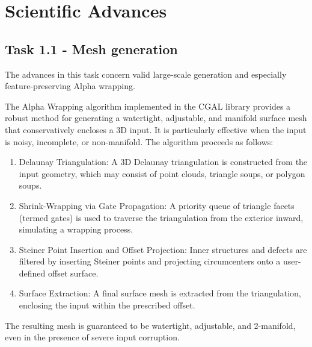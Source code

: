 \begin{itemize}
%
\end{itemize} 

\section{Scientific Advances}

\subsection{Task 1.1 - Mesh generation}
The advances in this task concern valid large-scale generation and especially feature-preserving Alpha wrapping.

The Alpha Wrapping algorithm implemented in the CGAL library provides a robust method for generating a watertight, adjustable, and manifold surface mesh that conservatively encloses a 3D input. It is particularly effective when the input is noisy, incomplete, or non-manifold. The algorithm proceeds as follows:

\begin{enumerate}
\item Delaunay Triangulation: A 3D Delaunay triangulation is constructed from the input geometry, which may consist of point clouds, triangle soups, or polygon soups.
\item Shrink-Wrapping via Gate Propagation: A priority queue of triangle facets (termed gates) is used to traverse the triangulation from the exterior inward, simulating a wrapping process.
\item Steiner Point Insertion and Offset Projection: Inner structures and defects are filtered by inserting Steiner points and projecting circumcenters onto a user-defined offset surface.
\item Surface Extraction: A final surface mesh is extracted from the triangulation, enclosing the input within the prescribed offset.
\end{enumerate}

The resulting mesh is guaranteed to be watertight, adjustable, and 2-manifold, even in the presence of severe input corruption.

